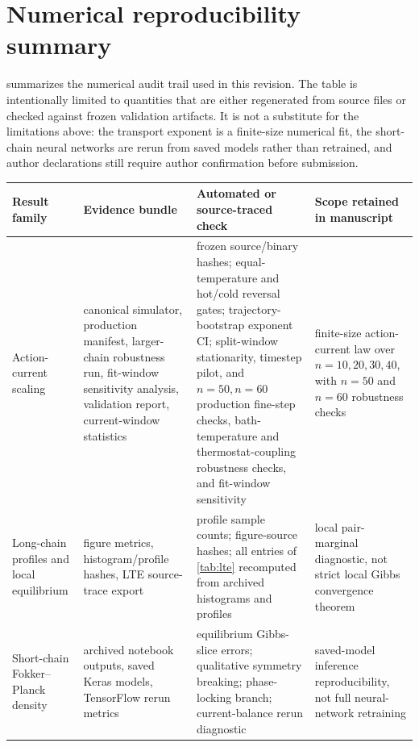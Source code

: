 \documentclass[11pt,a4paper]{article}
\theoremstyle{definition}
\numberwithin{equation}{section}   %
\begin{document}
\section*{Numerical reproducibility summary}

 summarizes the numerical audit trail used in this
revision. The table is intentionally limited to quantities that are either
regenerated from source files or checked against frozen validation artifacts.
It is not a substitute for the limitations above: the transport exponent is a
finite-size numerical fit, the short-chain neural networks are rerun from saved
models rather than retrained, and author declarations still require author
confirmation before submission.

\begin{table}[ht]\centering
\small
\setlength{\tabcolsep}{2pt}
\begin{tabular}{>{\raggedright\arraybackslash}p{}
                >{\raggedright\arraybackslash}p{}
                >{\raggedright\arraybackslash}p{}
                >{\raggedright\arraybackslash}p{}}
\toprule
Result family & Evidence bundle & Automated or source-traced check & Scope retained in manuscript \\
\midrule
Action-current scaling &
canonical simulator, production manifest, larger-chain robustness run,
fit-window sensitivity analysis, validation report, current-window statistics &
frozen source/binary hashes; equal-temperature and hot/cold reversal gates;
trajectory-bootstrap exponent CI; split-window stationarity, timestep pilot,
and $n=50,n=60$ production fine-step checks,
bath-temperature and thermostat-coupling robustness checks, and fit-window sensitivity &
finite-size action-current law over $n=10,20,30,40$, with $n=50$
and $n=60$ robustness checks \\
\midrule
Long-chain profiles and local equilibrium &
figure metrics, histogram/profile hashes, LTE source-trace export &
profile sample counts; figure-source hashes; all entries of \cref{tab:lte}
recomputed from archived histograms and profiles &
local pair-marginal diagnostic, not strict local Gibbs convergence theorem \\
\midrule
Short-chain Fokker--Planck density &
archived notebook outputs, saved Keras models, TensorFlow rerun metrics &
equilibrium Gibbs-slice errors; qualitative symmetry breaking; phase-locking
branch; current-balance rerun diagnostic &
saved-model inference reproducibility, not full neural-network retraining \\

\end{tabular}
\end{table}
\end{document}
